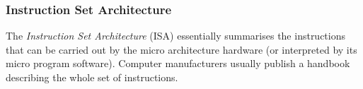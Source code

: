 %
%
%
%
%
%
%

\subsubsection{Instruction Set Architecture}
\label{instruction_set_architecture_heading}

The \emph{Instruction Set Architecture} (ISA) essentially summarises the
instructions that can be carried out by the micro architecture hardware (or
interpreted by its micro program software). Computer manufacturers usually
publish a handbook describing the whole set of instructions.

